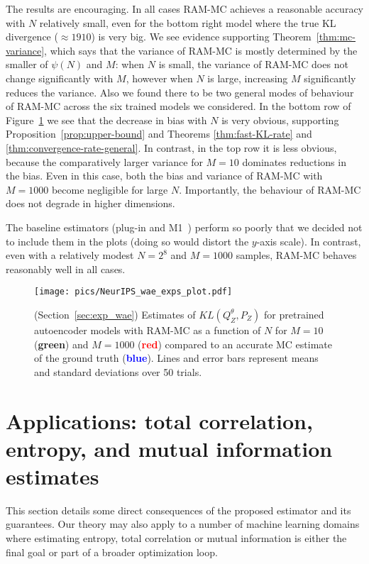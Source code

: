 The results are encouraging. 
In all cases RAM-MC achieves a reasonable accuracy with $N$ relatively small, even for the bottom right model where the true KL divergence ($\approx 1910$) is very big.
We see evidence supporting Theorem~\ref{thm:mc-variance}, which says that the variance of RAM-MC is mostly determined by the smaller of $\psi(N)$ and $M$:
when $N$ is small, the variance of RAM-MC does not change significantly with $M$, 
however when $N$ is large, increasing $M$ significantly reduces the variance. 
Also we found there to be two general modes of behaviour of RAM-MC across the six trained models we considered. 
In the bottom row of Figure~\ref{fig:real-exps} we see that the decrease in bias with $N$ is very obvious, supporting Proposition~\ref{prop:upper-bound} and Theorems \ref{thm:fast-KL-rate} and \ref{thm:convergence-rate-general}.
In contrast, in the top row it is less obvious, because the comparatively larger variance for $M{=}10$ dominates reductions in the bias.
Even in this case, both the bias and variance of RAM-MC with $M{=}1000$ become negligible for large $N$.
Importantly, the behaviour of RAM-MC does not degrade in higher dimensions.


The baseline estimators (plug-in \cite{moon14ensemble} and M1~\cite{nguyen10ratio}) perform so poorly that we decided not to include them in the plots (doing so would distort the $y$-axis scale).
In contrast, even with a relatively modest $N{=}2^8$ and $M{=}1000$ samples, RAM-MC behaves reasonably well in all cases.

\begin{figure}
\begin{center}
\texttt{[image: pics/NeurIPS\_wae\_exps\_plot.pdf]}
\end{center}
\caption{\label{fig:real-exps}
(Section~\ref{sec:exp_wae}) Estimates of $KL(Q_Z^\theta , P_Z)$ for pretrained autoencoder models with RAM-MC as a function of $N$ for $M{=}10$ ({\bf \textcolor{green!65!blue}{green}}) and $M{=}1000$ ({\bf \textcolor{red}{red}}) compared to an accurate MC estimate of the ground truth ({\bf\textcolor{blue}{blue}}).
Lines and error bars represent means and standard deviations over 50 trials.
}
\end{figure}



\section{Applications: total correlation, entropy, and mutual information estimates}\label{sec:applications}
This section details some direct consequences of the proposed estimator and its guarantees.
Our theory may also apply to a number of machine learning domains where estimating entropy, total correlation or mutual information is either the final goal or part of a broader optimization loop.
